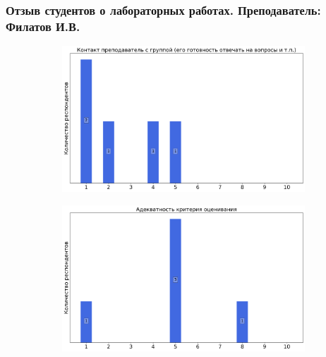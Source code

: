     \subsubsection{Отзыв студентов о лабораторных работах. Преподаватель: Филатов И.В.}
        \begin{figure}[H]
            \centering
            \begin{subfigure}[b]{0.45\textwidth}
                \centering
                \includegraphics[width=\textwidth]{images/2 course/Радиотехнические цепи и сигналы/labniks-marks-Филатов И.В.-0.png}
            \end{subfigure}
            \begin{subfigure}[b]{0.45\textwidth}
                \centering
                \includegraphics[width=\textwidth]{images/2 course/Радиотехнические цепи и сигналы/labniks-marks-Филатов И.В.-1.png}
            \end{subfigure}
            \begin{subfigure}[b]{0.45\textwidth}
                \centering

\end{subfigure}
\end{figure}
